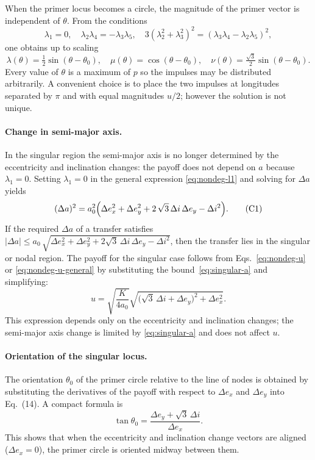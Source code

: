 \documentclass[12pt]{article}
\begin{document}
When the primer locus becomes a circle, the magnitude of the primer
vector is independent of $\theta$.  From the conditions
\[
  \lambda_1 = 0,\quad \lambda_2\lambda_4 = -\lambda_3\lambda_5,\quad
  3(\lambda_2^2 + \lambda_3^2)^2 = (\lambda_3\lambda_4 - \lambda_2\lambda_5)^2,
\]
one obtains up to scaling
\[
  \lambda(\theta) = \tfrac12\sin(\theta - \theta_0),\quad
  \mu(\theta)    =      \cos(\theta - \theta_0),\quad
  \nu(\theta)    = \tfrac{\sqrt{3}}{2}\sin(\theta - \theta_0).
\]
Every value of $\theta$ is a maximum of $p$ so the impulses may be
distributed arbitrarily.  A convenient choice is to place the two
impulses at longitudes separated by $\pi$ and with equal magnitudes
$u/2$; however the solution is not unique.

\paragraph{Change in semi-major axis.}  In the singular region the
semi-major axis is no longer determined by the eccentricity and
inclination changes: the payoff does not depend on $a$ because
$\lambda_1=0$.  Setting $\lambda_1=0$ in the general expression
\eqref{eq:nondeg-l1} and solving for $\Delta a$ yields
\begin{equation}
  (\Delta a)^2 = a_0^2\Bigl( \Delta e_x^2 + \Delta e_y^2 +
    2\,\sqrt{3}\,\Delta i\,\Delta e_y - \Delta i^2 \Bigr).
  \tag{C1}\label{eq:singular-a}
\end{equation}
If the required $\Delta a$ of a transfer satisfies
$|\Delta a|\leq a_0\,\sqrt{\Delta e_x^2 + \Delta e_y^2 + 2\sqrt{3}
\,\Delta i\,\Delta e_y - \Delta i^2}$, then the transfer lies in the
singular or nodal region.  The payoff for the singular case follows
from Eqs.~\eqref{eq:nondeg-u} or \eqref{eq:nondeg-u-general} by
substituting the bound~\eqref{eq:singular-a} and simplifying:
\begin{equation}
  u = \sqrt{\frac{K}{4a_0}}
        \sqrt{ \bigl( \sqrt{3}\,\Delta i + \Delta e_y\bigr)^2 + \Delta e_x^2 }.
  \tag{C2}\label{eq:singular-u}
\end{equation}
This expression depends only on the eccentricity and inclination
changes; the semi-major axis change is limited by
\eqref{eq:singular-a} and does not affect $u$.

\paragraph{Orientation of the singular locus.}  The orientation
$\theta_0$ of the primer circle relative to the line of nodes is
obtained by substituting the derivatives of the payoff with respect to
$\Delta e_x$ and $\Delta e_y$ into Eq.~(14).  A compact formula is
\begin{equation}
  \tan \theta_0 = \frac{\Delta e_y + \sqrt{3}\,\Delta i}{\Delta e_x}.
  \tag{C3}\label{eq:singular-theta0}
\end{equation}
This shows that when the eccentricity and inclination change vectors
are aligned ($\Delta e_x=0$), the primer circle is oriented midway
between them.
\end{document}
